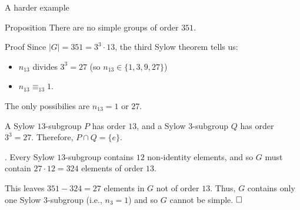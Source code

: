 \documentclass[8pt, handout]{beamer}
\newcommand{\Pause}{}      %
\begin{document}
\begin{frame}{A harder example} 

  \begin{block}{Proposition}
    There are no simple groups of order $351$.
  \end{block}

  \Pause

  \begin{exampleblock}{Proof} %
    Since $|G|=351=3^3\cdot 13$, the third Sylow theorem tells us: \Pause
    \begin{itemize}
      \item $n_{13}$ divides $3^3=27$ (so $n_{13}\in\{1,3,9,27\}$) \Pause
      \item $n_{13}\equiv_{13} 1$. \Pause
    \end{itemize}
    The only possibilies are $n_{13}=1$ or $27$.

    \bigskip\pause

    A Sylow $13$-subgroup $P$ has order
    $13$, and a Sylow $3$-subgroup $Q$ has order $3^3=27$.
    Therefore, $P\cap Q=\{e\}$. 

    \bigskip\pause

    . \Pause Every Sylow $13$-subgroup contains
    $12$ non-identity elements, and so {\color{xBlue}$G$ must contain $27\cdot
    12=324$ elements of order $13$}.

    \bigskip\Pause

    This leaves {\color{xBlue}$351-324=27$ elements in $G$ not of order
      $13$}. \Pause Thus, $G$ contains only one Sylow $3$-subgroup
      (i.e., $n_3=1$) and so $G$ cannot be simple. $\hfill\Box$
  \end{exampleblock}

\end{frame}

\end{document}
